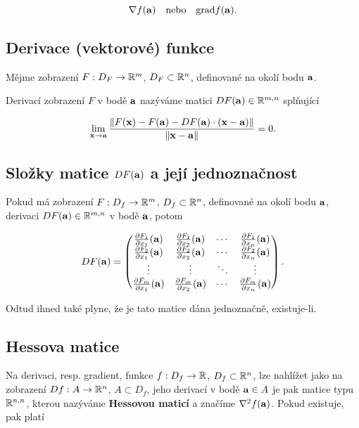 \[ \nabla f(\mathbf{a}) \quad \text{nebo} \quad \mathrm{grad} f(\mathbf{a}). \]

\subsection*{Derivace (vektorové) funkce}

Mějme zobrazení $F: D_F \to \mathbb{R}^m$, $D_F \subset \mathbb{R}^n$, definované na okolí bodu
$\mathbf{a}$.

Derivací zobrazení $F$ v bodě $\mathbf{a}$ nazýváme matici $DF(\mathbf{a}) \in \mathbb{R}^{m,n}$
splňující

\[ \lim_{\mathbf{x} \to \mathbf{a}} \frac{\|F(\mathbf{x}) - F(\mathbf{a}) - DF(\mathbf{a}) \cdot (\mathbf{x} - \mathbf{a}) \|}{\|\mathbf{x} - \mathbf{a}\|} = 0. \]

\subsection*{Složky matice $DF(\mathbf{a})$ a její jednoznačnost}

Pokud má zobrazení $F: D_f \to \mathbb{R}^m$, $D_f \subset \mathbb{R}^n$, definované na okolí
bodu $\mathbf{a}$, derivaci $DF(\mathbf{a}) \in \mathbb{R}^{m,n}$ v bodě $\mathbf{a}$, potom

\[ DF(\mathbf{a}) = \begin{pmatrix}
        \frac{\partial F_1}{\partial x_1}(\mathbf{a}) & \frac{\partial F_1}{\partial x_2}(\mathbf{a}) & \cdots & \frac{\partial F_1}{\partial x_n}(\mathbf{a}) \\ \frac{\partial F_2}{\partial x_1}(\mathbf{a}) & \frac{\partial F_2}{\partial x_2}(\mathbf{a}) & \cdots & \frac{\partial F_2}{\partial x_n}(\mathbf{a}) \\ \vdots & \vdots & \ddots & \vdots \\ \frac{\partial F_m}{\partial x_1}(\mathbf{a}) & \frac{\partial F_m}{\partial x_2}(\mathbf{a}) & \cdots & \frac{\partial F_m}{\partial x_n}(\mathbf{a})
    \end{pmatrix}. \]

\noindent Odtud ihned také plyne, že je tato matice dána jednoznačně, existuje-li.

\subsection*{Hessova matice}

Na derivaci, resp. gradient, funkce $f: D_f \to \mathbb{R}$, $D_f \subset \mathbb{R}^n$, lze
nahlížet jako na zobrazení $Df: A \to \mathbb{R}^n$, $A \subset D_f$, jeho derivací v
bodě $\mathbf{a} \in A$ je pak matice typu $\mathbb{R}^{n,n}$, kterou nazýváme
\textbf{Hessovou maticí} a značíme $\nabla^2 f(\mathbf{a})$. Pokud existuje, pak platí

